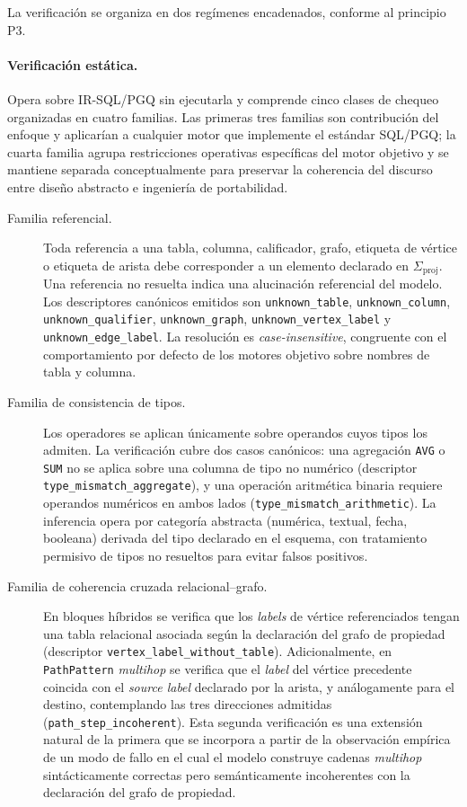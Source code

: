 La verificación se organiza en dos regímenes encadenados, conforme al principio P3.

\paragraph{Verificación estática.} Opera sobre IR-SQL/PGQ sin ejecutarla y comprende cinco clases de chequeo organizadas en cuatro familias. Las primeras tres familias son contribución del enfoque y aplicarían a cualquier motor que implemente el estándar \ac{SQL}/\ac{PGQ}; la cuarta familia agrupa restricciones operativas específicas del motor objetivo y se mantiene separada conceptualmente para preservar la coherencia del discurso entre diseño abstracto e ingeniería de portabilidad.

\begin{description}
    \item[Familia referencial.] Toda referencia a una tabla, columna, calificador, grafo, etiqueta de vértice o etiqueta de arista debe corresponder a un elemento declarado en $\Sigma_{\mathrm{proj}}$. Una referencia no resuelta indica una alucinación referencial del modelo. Los descriptores canónicos emitidos son \texttt{unknown\_table}, \texttt{unknown\_column}, \texttt{unknown\_qualifier}, \texttt{unknown\_graph}, \texttt{unknown\_vertex\_label} y \texttt{unknown\_edge\_label}. La resolución es \emph{case-insensitive}, congruente con el comportamiento por defecto de los motores objetivo sobre nombres de tabla y columna.

    \item[Familia de consistencia de tipos.] Los operadores se aplican únicamente sobre operandos cuyos tipos los admiten. La verificación cubre dos casos canónicos: una agregación \texttt{AVG} o \texttt{SUM} no se aplica sobre una columna de tipo no numérico (descriptor \texttt{type\_mismatch\_aggregate}), y una operación aritmética binaria requiere operandos numéricos en ambos lados (\texttt{type\_mismatch\_arithmetic}). La inferencia opera por categoría abstracta (numérica, textual, fecha, booleana) derivada del tipo declarado en el esquema, con tratamiento permisivo de tipos no resueltos para evitar falsos positivos.

    \item[Familia de coherencia cruzada relacional--grafo.] En bloques híbridos se verifica que los \emph{labels} de vértice referenciados tengan una tabla relacional asociada según la declaración del grafo de propiedad (descriptor \texttt{vertex\_label\_without\_table}). Adicionalmente, en \texttt{PathPattern} \emph{multihop} se verifica que el \emph{label} del vértice precedente coincida con el \emph{source label} declarado por la arista, y análogamente para el destino, contemplando las tres direcciones admitidas (\texttt{path\_step\_incoherent}). Esta segunda verificación es una extensión natural de la primera que se incorpora a partir de la observación empírica de un modo de fallo en el cual el modelo construye cadenas \emph{multihop} sintácticamente correctas pero semánticamente incoherentes con la declaración del grafo de propiedad. %


\end{description}
